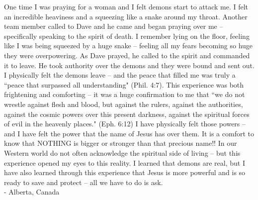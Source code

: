 \documentclass[oneside,12pt]{book}
\begin{document}
One time I was praying for a woman and I felt demons start to attack me. I felt an incredible heaviness and a squeezing like a snake around my throat. Another team member called to Dave and he came and began praying over me -- specifically speaking to the spirit of death. I remember lying on the floor, feeling like I was being squeezed by a huge snake -- feeling all my fears becoming so huge they were overpowering. As Dave prayed, he called to the spirit and commanded it to leave. He took authority over the demons and they were bound and sent out. I physically felt the demons leave -- and the peace that filled me was truly a ``peace that surpassed all understanding" (Phil. 4:7).
This experience was both frightening and comforting -- it was a huge confirmation to me that ``we do not wrestle against flesh and blood, but against the rulers, against the authorities, against the cosmic powers over this present darkness, against the spiritual forces of evil in the heavenly places." (Eph. 6:12)  I have physically felt those powers -- and I have felt the power that the name of Jesus has over them. It is a comfort to know that NOTHING is bigger or stronger than that precious name!!
In our Western world do not often acknowledge the spiritual side of living -- but this experience opened my eyes to this reality. I learned that demons are real, but I have also learned through this experience that Jesus is more powerful and is so ready to save and protect -- all we have to do is ask. \\
- Alberta, Canada
\clearpage

\end{document}
